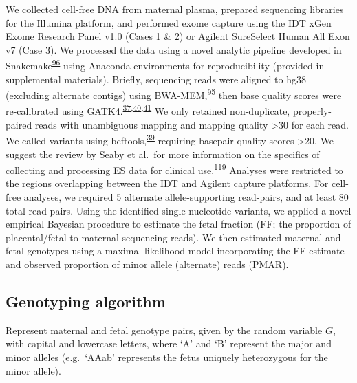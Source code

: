 \documentclass[11pt,letterpaper]{book}
\begin{document}
We collected cell-free DNA from maternal plasma, prepared sequencing libraries for the Illumina platform, and performed exome capture using the IDT xGen Exome Research Panel v1.0 (Cases 1 \& 2) or Agilent SureSelect Human All Exon v7 (Case 3).
We processed the data using a novel analytic pipeline developed in Snakemake\textsuperscript{\protect\hyperlink{ref-koster:2012aa}{96}} using Anaconda environments for reproducibility (provided in supplemental materials).
Briefly, sequencing reads were aligned to hg38 (excluding alternate contigs) using BWA-MEM,\textsuperscript{\protect\hyperlink{ref-li:2013ab}{95}} then base quality scores were re-calibrated using GATK4.\textsuperscript{\protect\hyperlink{ref-mckenna:2010aa}{37},\protect\hyperlink{ref-van-der-auwera:2013aa}{40},\protect\hyperlink{ref-poplin:2018aa}{41}}
We only retained non-duplicate, properly-paired reads with unambiguous mapping and mapping quality \textgreater30 for each read.
We called variants using bcftools,\textsuperscript{\protect\hyperlink{ref-li:2011aa}{39}} requiring basepair quality scores \textgreater20.
We suggest the review by Seaby et al.~for more information on the specifics of collecting and processing ES data for clinical use.\textsuperscript{\protect\hyperlink{ref-seaby:2016aa}{119}}
Analyses were restricted to the regions overlapping between the IDT and Agilent capture platforms.
For cell-free analyses, we required 5 alternate allele-supporting read-pairs, and at least 80 total read-pairs.
Using the identified single-nucleotide variants, we applied a novel empirical Bayesian procedure to estimate the fetal fraction (FF; the proportion of placental/fetal to maternal sequencing reads).
We then estimated maternal and fetal genotypes using a maximal likelihood model incorporating the FF estimate and observed proportion of minor allele (alternate) reads (PMAR).

\hypertarget{genotyping-algorithm}{%
\subsection{Genotyping algorithm}\label{genotyping-algorithm}}

\newcommand{\Var}[2][]{\text{Var}_{#1}\left(#2\right)}
\newcommand\I[1]{\text{I}\left(#1\right)}

Represent maternal and fetal genotype pairs, given by the random variable \(G\), with capital and lowercase letters, where `A' and `B' represent the major and minor alleles (e.g.~`AAab' represents the fetus uniquely heterozygous for the minor allele).
\end{document}
